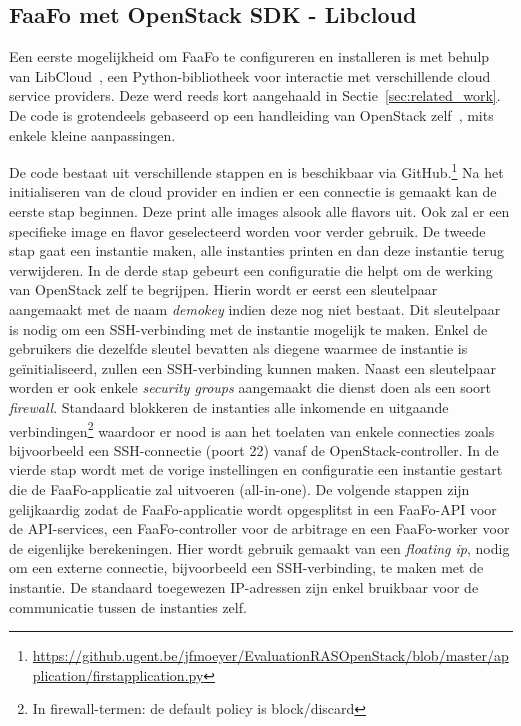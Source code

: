 \subsection{FaaFo met OpenStack SDK - Libcloud}

Een eerste mogelijkheid om FaaFo te configureren en installeren is met behulp van LibCloud~\cite{Libcloud}, een Python-bibliotheek voor interactie met verschillende cloud service providers. Deze werd reeds kort aangehaald in Sectie~\ref{sec:related_work}. De code is grotendeels gebaseerd op een handleiding van OpenStack zelf~\cite{OpenStack2017k}, mits enkele kleine aanpassingen.

De code bestaat uit verschillende stappen en is beschikbaar via GitHub.\footnote{\url{https://github.ugent.be/jfmoeyer/EvaluationRASOpenStack/blob/master/application/firstapplication.py}} Na het initialiseren van de cloud provider en indien er een connectie is gemaakt kan de eerste stap beginnen. Deze print alle images alsook alle flavors uit. Ook zal er een specifieke image en flavor geselecteerd worden voor verder gebruik. De tweede stap gaat een instantie maken, alle instanties printen en dan deze instantie terug verwijderen. In de derde stap gebeurt een configuratie die helpt om de werking van OpenStack zelf te begrijpen. Hierin wordt er eerst een sleutelpaar aangemaakt met de naam \textit{demokey} indien deze nog niet bestaat. Dit sleutelpaar is nodig om een SSH-verbinding met de instantie mogelijk te maken. Enkel de gebruikers die dezelfde sleutel bevatten als diegene waarmee de instantie is geïnitialiseerd, zullen een SSH-verbinding kunnen maken. Naast een sleutelpaar worden er ook enkele \textit{security groups} aangemaakt die dienst doen als een soort \textit{firewall}. Standaard blokkeren de instanties alle inkomende en uitgaande verbindingen\footnote{In firewall-termen: de default policy is block/discard} waardoor er nood is aan het toelaten van enkele connecties zoals bijvoorbeeld een SSH-connectie (poort 22) vanaf de OpenStack-controller. In de vierde stap wordt met de vorige instellingen en configuratie een instantie gestart die de FaaFo-applicatie zal uitvoeren (all-in-one). De volgende stappen zijn gelijkaardig zodat de FaaFo-applicatie wordt opgesplitst in een FaaFo-API voor de API-services, een FaaFo-controller voor de arbitrage en een FaaFo-worker voor de eigenlijke berekeningen. Hier wordt gebruik gemaakt van een \textit{floating ip}, nodig om een externe connectie, bijvoorbeeld een SSH-verbinding, te maken met de instantie. De standaard toegewezen IP-adressen zijn enkel bruikbaar voor de communicatie tussen de instanties zelf.

